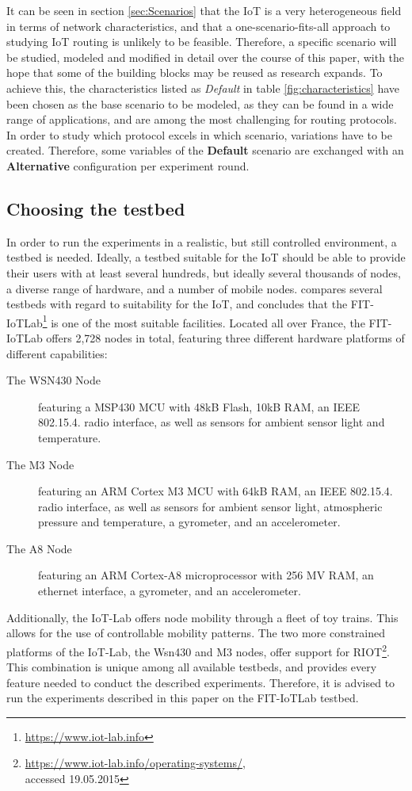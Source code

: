 \documentclass{acm_proc_article-sp}
\begin{document}
It can be seen in section \ref{sec:Scenarios} that the IoT is a very heterogeneous field in terms of network characteristics, and that a one-scenario-fits-all approach to studying IoT routing is unlikely to be feasible. Therefore, a specific scenario will be studied, modeled and modified in detail over the course of this paper, with the hope that some of the building blocks may be reused as research expands. To achieve this, the characteristics listed as \emph{Default} in table \ref{fig:characteristics} have been chosen as the base scenario to be modeled, as they can be found in a wide range of applications, and are among the most challenging for routing protocols.
In order to study which protocol excels in which scenario, variations have to be created. Therefore, some variables of the \textbf{Default} scenario are exchanged with an \textbf{Alternative} configuration per experiment round.

\subsection{Choosing the testbed}
\label{subsec:testbed_choice}
In order to run the experiments in a realistic, but still controlled environment, a testbed is needed. Ideally, a testbed suitable for the IoT should be able to provide their users with at least several hundreds, but ideally several thousands of nodes, a diverse range of hardware, and a number of mobile nodes. \cite{testbed-survey} compares several testbeds with regard to suitability for the IoT, and concludes that the FIT-IoTLab\footnote{ \url{https://www.iot-lab.info}} is one of the most suitable facilities. Located all over France, the FIT-IoTLab offers 2,728 nodes in total, featuring three different hardware platforms of different capabilities:
\begin{description}
\item[The WSN430 Node] featuring a MSP430 MCU with 48kB Flash, 10kB RAM, an IEEE 802.15.4. radio interface, as well as sensors for ambient sensor light and temperature.
\item[The M3 Node] featuring an ARM Cortex M3 MCU with 64kB RAM, an IEEE 802.15.4. radio interface, as well as sensors for ambient sensor light, atmospheric pressure and temperature, a gyrometer, and an accelerometer.
\item[The A8 Node] featuring an ARM Cortex-A8 microprocessor with 256 MV RAM, an ethernet interface, a gyrometer, and an accelerometer.
\end{description}
Additionally, the IoT-Lab offers node mobility through a fleet of toy trains. This allows for the use of controllable mobility patterns.
The two more constrained platforms of the IoT-Lab, the Wsn430 and M3 nodes, offer support for RIOT\cite{riot}\footnote{ \url{https://www.iot-lab.info/operating-systems/}, \\accessed 19.05.2015}.
This combination is unique among all available testbeds, and provides every feature needed to conduct the described experiments. Therefore, it is advised to run the experiments described in this paper on the FIT-IoTLab testbed.
\end{document}
